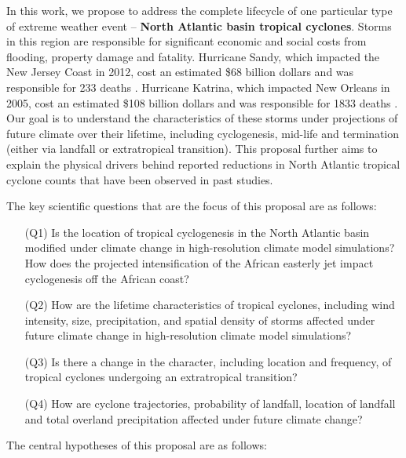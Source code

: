 \documentclass[11pt]{article}
\begin{document}
In this work, we propose to address the complete lifecycle of one particular type of extreme weather event -- \textbf{North Atlantic basin tropical cyclones}.  Storms in this region are responsible for significant economic and social costs from flooding, property damage and fatality.  Hurricane Sandy, which impacted the New Jersey Coast in 2012, cost an estimated \$68 billion dollars and was responsible for 233 deaths \citep{Blake2012Report}.  Hurricane Katrina, which impacted New Orleans in 2005, cost an estimated \$108 billion dollars and was responsible for 1833 deaths \citep{Knabb2005Report}.  Our goal is to understand the characteristics of these storms under projections of future climate over their lifetime, including cyclogenesis, mid-life and termination (either via landfall or extratropical transition).  This proposal  further aims to explain the physical drivers behind reported reductions in North Atlantic tropical cyclone counts that have been observed in past studies.

The key scientific questions that are the focus of this proposal are as follows:
\begin{itemize}
\item[(Q1)] Is the location of tropical cyclogenesis in the North Atlantic basin modified under climate change in high-resolution climate model simulations? How does the projected intensification of the African easterly jet impact cyclogenesis off the African coast?

\item[(Q2)] How are the lifetime characteristics of tropical cyclones, including wind intensity, size, precipitation, and spatial density of storms affected under future climate change in high-resolution climate model simulations?

\item[(Q3)] Is there a change in the character, including location and frequency, of tropical cyclones undergoing an extratropical transition?

\item[(Q4)] How are cyclone trajectories, probability of landfall, location of landfall and total overland precipitation affected under future climate change? 
\end{itemize}

The central hypotheses of this proposal are as follows:
\end{document}
